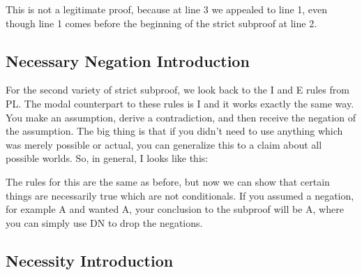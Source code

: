 This is not a legitimate proof, because at line 3 we appealed to line 1, even though line 1 comes before the beginning of the strict subproof at line 2.

\subsection{Necessary Negation Introduction}

For the second variety of strict subproof, we look back to the \enot I and \enot E rules from PL. The modal counterpart to these rules is \ebox \enot I and it works exactly the same way. You make an assumption, derive a contradiction, and then receive the negation of the assumption. The big thing is that if you didn't need to use anything which was merely possible or actual, you can generalize this to a claim about all possible worlds. So, in general, \ebox \enot I looks like this: 

The rules for this are the same as before, but now we can show that certain things are necessarily true which are not conditionals. If you assumed a negation, for example \enot A and wanted \ebox A, your conclusion to the subproof will be \ebox \enot \enot A, where you can simply use DN to drop the negations. 

\subsection{Necessity Introduction}

